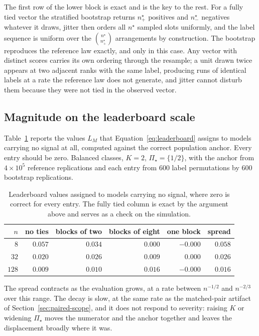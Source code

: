 \documentclass[11pt]{article}
\newcommand{\PSet}{\Pi_\star}
\theoremstyle{remark}
\begin{document}
The first row of the lower block is exact and is the key to the rest. For a fully tied vector the stratified bootstrap returns $n^\star_+$ positives and $n^\star_-$ negatives whatever it draws, jitter then orders all $n^\star$ sampled slots uniformly, and the label sequence is uniform over the $\binom{n^\star}{n^\star_+}$ arrangements by construction. The bootstrap reproduces the reference law exactly, and only in this case. Any vector with distinct scores carries its own ordering through the resample; a unit drawn twice appears at two adjacent ranks with the same label, producing runs of identical labels at a rate the reference law does not generate, and jitter cannot disturb them because they were not tied in the observed vector.

\subsection{Magnitude on the leaderboard scale}

Table~\ref{tab:anchor-decay} reports the values $L_M$ that Equation~\eqref{eq:leaderboard} assigns to models carrying no signal at all, computed against the correct population anchor. Every entry should be zero. Balanced classes, $K=2$, $\PSet=\{1/2\}$, with the anchor from $4\times10^{5}$ reference replications and each entry from $600$ label permutations by $600$ bootstrap replications.

\begin{table}[ht]
\centering
\caption{Leaderboard values assigned to models carrying no signal, where zero is correct for every entry. The fully tied column is exact by the argument above and serves as a check on the simulation.}
\label{tab:anchor-decay}
\begin{tabular}{@{}rrrrrr@{}}
\toprule
$n$ & no ties & blocks of two & blocks of eight & one block & spread \\
\midrule
$8$ & $0.057$ & $0.034$ & $0.000$ & $-0.000$ & $0.058$ \\
$32$ & $0.020$ & $0.026$ & $0.009$ & $0.000$ & $0.026$ \\
$128$ & $0.009$ & $0.010$ & $0.016$ & $-0.000$ & $0.016$ \\
\bottomrule
\end{tabular}
\end{table}

The spread contracts as the evaluation grows, at a rate between $n^{-1/2}$ and $n^{-2/3}$ over this range. The decay is slow, at the same rate as the matched-pair artifact of Section~\ref{sec:paired-scope}, and it does not respond to severity: raising $K$ or widening $\PSet$ moves the numerator and the anchor together and leaves the displacement broadly where it was.
\end{document}

